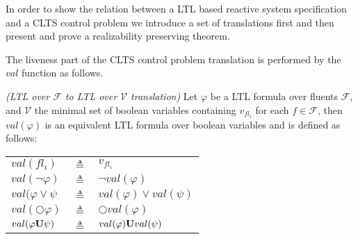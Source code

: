 In order to show the relation between a LTL based reactive system specification and a CLTS control problem we introduce a set of translations first and then present and prove a realizability preserving theorem.

The liveness part of the CLTS control problem translation is performed by the $val$ function as follows.
\begin{definition}
	\label{def:val_ltl} \emph{(LTL over $\mathcal{F}$ to LTL over $\mathcal{V}$ translation)} 
	Let $\varphi$ be a LTL formula over fluents $\mathcal{F}$, and $\mathcal{V}$ the minimal set of boolean variables containing $v_{fl_i}$ for each $f \in \mathcal{F}$, then $val(\varphi)$ is an equivalent LTL formula over boolean variables and is defined as follows:\\
	
	\begin{tabular}{ l c l }
		$val(fl_i)$ & $\triangleq$ & $v_{fl_i}$\\	
		$val(\neg \varphi)$ & $\triangleq$ & $\neg val(\varphi)$\\
		$val(\varphi \vee \psi$ & $\triangleq$ & $val(\varphi) \vee val(\psi)$\\
		$val(\bigcirc \varphi)$ & $\triangleq$ & $\bigcirc val(\varphi)$\\
		$val(\varphi {\bf U} \psi)$ & $\triangleq$ & $val(\varphi) {\bf U} val(\psi)$\\
	\end{tabular}	
\end{definition}

